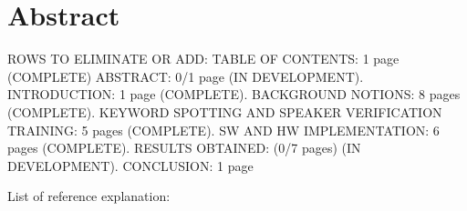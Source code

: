 \chapter*{Abstract} %
\label{abtract}

ROWS TO ELIMINATE OR ADD:\newline\newline
TABLE OF CONTENTS: 1 page (COMPLETE)\newline
ABSTRACT: 0/1 page (IN DEVELOPMENT). INTRODUCTION: 1 page (COMPLETE). BACKGROUND NOTIONS: 8 pages (COMPLETE). KEYWORD SPOTTING AND SPEAKER VERIFICATION TRAINING: 5 pages (COMPLETE). SW AND HW IMPLEMENTATION: 6 pages (COMPLETE). RESULTS OBTAINED: (0/7 pages) (IN DEVELOPMENT). CONCLUSION: 1 page\newline
{} %
List of reference explanation:\newline
